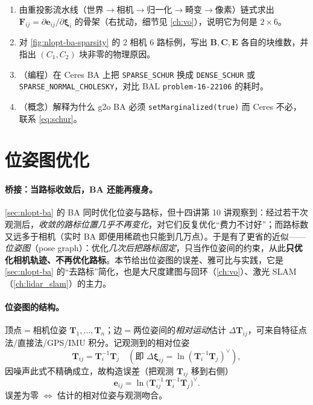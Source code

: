 \begin{practice}
\begin{enumerate}
  \item 由重投影流水线（世界$\to$相机$\to$归一化$\to$畸变$\to$像素）链式求出 $\mathbf{F}_{ij}=\partial\mathbf{e}_{ij}/\partial\boldsymbol{\xi}_i$ 的骨架（右扰动，细节见 \cref{ch:vo}），说明它为何是 $2\times6$。
  \item 对 \cref{fig:nlopt-ba-sparsity} 的 2 相机 6 路标例，写出 $\mathbf{B},\mathbf{C},\mathbf{E}$ 各自的块维数，并指出 $(C_1,C_2)$ 块非零的物理原因。
  \item （编程）在 Ceres BA 上把 \texttt{SPARSE\_SCHUR} 换成 \texttt{DENSE\_SCHUR} 或 \texttt{SPARSE\_NORMAL\_CHOLESKY}，对比 BAL \texttt{problem-16-22106} 的耗时。
  \item （概念）解释为什么 g2o BA 必须 \texttt{setMarginalized(true)} 而 Ceres 不必，联系 \cref{eq:schur}。
\end{enumerate}
\end{practice}

\section{位姿图优化}
\label{sec:nlopt-posegraph}

\paragraph{桥接：当路标收敛后，BA 还能再瘦身。}\cite{gaoxiang2019slam14}
\cref{sec:nlopt-ba} 的 BA 同时优化位姿与路标，但十四讲第 10 讲观察到：经过若干次观测后，\emph{收敛的路标位置几乎不再变化}，对它们反复优化“费力不讨好”；而路标数又远多于相机（实时 BA 即便用稀疏也只能到几万点）。于是有了更省的近似——\emph{位姿图}（pose graph）：优化\emph{几次后把路标固定}，只当作位姿间的约束，从此\textbf{只优化相机轨迹、不再优化路标}。本节给出位姿图的误差、雅可比与实践，它是 \cref{sec:nlopt-ba} 的“去路标”简化，也是大尺度建图与回环（\cref{ch:vo}）、激光 SLAM（\cref{ch:lidar_slam}）的主力。

\paragraph{位姿图的结构。}\cite{gaoxiang2019slam14}
顶点$=$相机位姿 $\mathbf{T}_1,\dots,\mathbf{T}_n$；边$=$两位姿间的\emph{相对运动}估计 $\Delta\mathbf{T}_{ij}$，可来自特征点法/直接法/GPS/IMU 积分。记观测到的相对位姿
\begin{equation}
  \mathbf{T}_{ij}=\mathbf{T}_i^{-1}\mathbf{T}_j\quad(\text{即 }\Delta\boldsymbol{\xi}_{ij}=\ln(\mathbf{T}_i^{-1}\mathbf{T}_j)^\vee),
  \label{eq:nlopt-pg-meas}
\end{equation}
因噪声此式不精确成立，故构造误差（把观测 $\mathbf{T}_{ij}$ 移到右侧）
\begin{equation}
  \mathbf{e}_{ij}=\ln\!\big(\mathbf{T}_{ij}^{-1}\,\mathbf{T}_i^{-1}\mathbf{T}_j\big)^\vee.
  \label{eq:nlopt-pg-err}
\end{equation}
误差为零 $\iff$ 估计的相对位姿与观测吻合。

